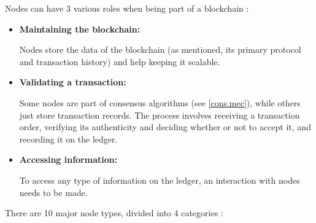 Nodes can have 3 various roles when being part of a blockchain \cite{node_type}:

\begin{itemize}
    \item \textbf{Maintaining the blockchain:}
    
Nodes store the data of the blockchain (as mentioned, its primary protocol and transaction history) and help keeping it scalable. 
    
    \item \textbf{Validating a transaction:}

    Some nodes are part of consensus algorithms (see \ref{cons.mec}), while others just store transaction records. The process involves receiving a transaction order, verifying its authenticity and deciding whether or not to accept it, and recording it on the ledger.
    
    \item \textbf{Accessing information:}

    To access any type of information on the ledger, an interaction with nodes needs to be made. 
\end{itemize}

There are 10 major node types, divided into 4 categories \cite{node_type}:

